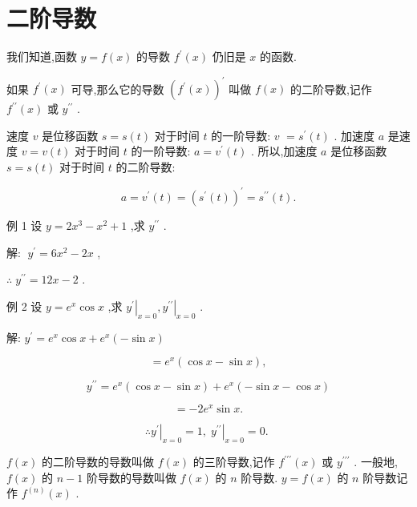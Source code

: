 \documentclass[lang=cn,newtx,12pt,scheme=chinese]{elegantbook}
\begin{document}
\section{二阶导数}

我们知道,函数 \(y = f\left( x\right)\) 的导数 \({f}^{\prime }\left( x\right)\) 仍旧是 \(x\) 的函数.
\begin{definition}[二阶导数]
如果 \({f}^{\prime }\left( x\right)\) 可导,那么它的导数 \({\left( {f}^{\prime }\left( x\right) \right) }^{\prime }\) 叫做 \(f\left( x\right)\) 的二阶导数,记作 \({f}^{\prime \prime }\left( x\right)\) 或 \({y}^{\prime \prime }\) .
\end{definition}
速度 \(v\) 是位移函数 \(s = s\left( t\right)\) 对于时间 \(t\) 的一阶导数: \(v\) \(= {s}^{\prime }\left( t\right)\) . 加速度 \(a\) 是速度 \(v = v\left( t\right)\) 对于时间 \(t\) 的一阶导数: \(a = {v}^{\prime }\left( t\right)\) . 所以,加速度 \(a\) 是位移函数 \(s = s\left( t\right)\) 对于时间 \(t\) 的二阶导数:

\[
a = {v}^{\prime }\left( t\right) = {\left( {s}^{\prime }\left( t\right) \right) }^{\prime } = {s}^{\prime \prime }\left( t\right) .
\]

例 1 设 \(y = 2{x}^{3} - {x}^{2} + 1\) ,求 \({y}^{\prime \prime }\) .

解: \(\;{y}^{\prime } = 6{x}^{2} - {2x}\) ,

\(\therefore \;{y}^{\prime \prime } = {12x} - 2\) .

例 2 设 \(y = {e}^{x}\cos x\) ,求 \({\left. {y}^{\prime }\right| }_{x = 0},{\left. {y}^{\prime \prime }\right| }_{x = 0}\) .

解: \({y}^{\prime } = {e}^{x}\cos x + {e}^{x}\left( {-\sin x}\right)\)

\[
= {e}^{x}\left( {\cos x - \sin x}\right) ,
\]

\[
{y}^{\prime \prime } = {e}^{x}\left( {\cos x - \sin x}\right) + {e}^{x}\left( {-\sin x - \cos x}\right)
\]

\[
= - 2{e}^{x}\sin x\text{.}
\]

\[
\therefore {\left. {y}^{\prime }\right| }_{x = 0} = 1,{\left. \;{y}^{\prime \prime }\right| }_{x = 0} = 0\text{. }
\]

\(f\left( x\right)\) 的二阶导数的导数叫做 \(f\left( x\right)\) 的三阶导数,记作 \({f}^{\prime \prime \prime }\left( x\right)\) 或 \({y}^{\prime \prime \prime }\) . 一般地, \(f\left( x\right)\) 的 \(n - 1\) 阶导数的导数叫做 \(f\left( x\right)\) 的 \(n\) 阶导数. \(y = f\left( x\right)\) 的 \(n\) 阶导数记作 \({f}^{\left( n\right) }\left( x\right)\) .
\end{document}
